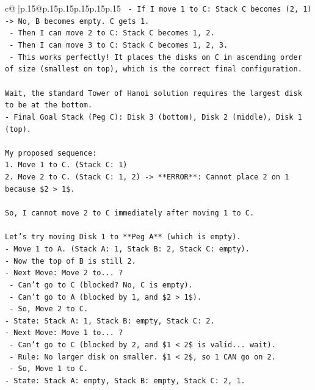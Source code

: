 \documentclass{article}
\begin{document}
{\begin{supertabular}{c@{$\;$}|p{.15\linewidth}@{}p{.15\linewidth}p{.15\linewidth}p{.15\linewidth}p{.15\linewidth}p{.15\linewidth}}
{{{\texttt{  {-} If I move 1 to C: Stack C becomes (2, 1) {-}> No, B becomes empty. C gets 1.} \\
\texttt{  {-} Then I can move 2 to C: Stack C becomes 1, 2.} \\
\texttt{  {-} Then I can move 3 to C: Stack C becomes 1, 2, 3.} \\
\texttt{  {-} This works perfectly! It places the disks on C in ascending order of size (smallest on top), which is the correct final configuration.} \\
\\ 
\texttt{Wait, the standard Tower of Hanoi solution requires the largest disk to be at the bottom.} \\
\texttt{{-} Final Goal Stack (Peg C): Disk 3 (bottom), Disk 2 (middle), Disk 1 (top).} \\
\\ 
\texttt{My proposed sequence:} \\
\texttt{1. Move 1 to C. (Stack C: 1)} \\
\texttt{2. Move 2 to C. (Stack C: 1, 2) {-}> **ERROR**: Cannot place 2 on 1 because \$2 > 1\$.} \\
\\ 
\texttt{So, I cannot move 2 to C immediately after moving 1 to C.} \\
\\ 
\texttt{Let's try moving Disk 1 to **Peg A** (which is empty).} \\
\texttt{{-} Move 1 to A. (Stack A: 1, Stack B: 2, Stack C: empty).} \\
\texttt{{-} Now the top of B is still 2.} \\
\texttt{{-} Next Move: Move 2 to... ?} \\
\texttt{  {-} Can't go to C (blocked? No, C is empty).} \\
\texttt{  {-} Can't go to A (blocked by 1, and \$2 > 1\$).} \\
\texttt{  {-} So, Move 2 to C.} \\
\texttt{{-} State: Stack A: 1, Stack B: empty, Stack C: 2.} \\
\texttt{{-} Next Move: Move 1 to... ?} \\
\texttt{  {-} Can't go to C (blocked by 2, and \$1 < 2\$ is valid... wait).} \\
\texttt{  {-} Rule: No larger disk on smaller. \$1 < 2\$, so 1 CAN go on 2.} \\
\texttt{  {-} So, Move 1 to C.} \\
\texttt{{-} State: Stack A: empty, Stack B: empty, Stack C: 2, 1.} \\
}}}
\end{supertabular}}
\end{document}
